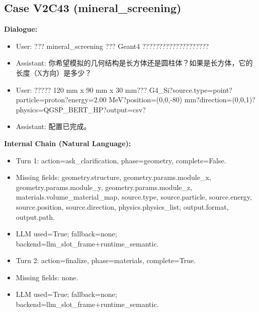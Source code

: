 \documentclass[11pt]{ctexart}
\begin{document}
\subsection{Case V2C43 (mineral\_screening)}
\textbf{Dialogue:}
\begin{itemize}
\item User: ??? mineral\_screening ??? Geant4 ????????????????????
\item Assistant: 你希望模拟的几何结构是长方体还是圆柱体？如果是长方体，它的长度（X方向）是多少？
\item User: ????? 120 mm x 90 mm x 30 mm??? G4\_Si?source.type=point?particle=proton?energy=2.00 MeV?position=(0,0,-80) mm?direction=(0,0,1)?physics=QGSP\_BERT\_HP?output=csv?
\item Assistant: 配置已完成。
\end{itemize}
\textbf{Internal Chain (Natural Language):}
\begin{itemize}
\item Turn 1: action=ask\_clarification, phase=geometry, complete=False.
\item Missing fields: geometry.structure, geometry.params.module\_x, geometry.params.module\_y, geometry.params.module\_z, materials.volume\_material\_map, source.type, source.particle, source.energy, source.position, source.direction, physics.physics\_list, output.format, output.path.
\item LLM used=True; fallback=none; backend=llm\_slot\_frame+runtime\_semantic.
\item Turn 2: action=finalize, phase=materials, complete=True.
\item Missing fields: none.
\item LLM used=True; fallback=none; backend=llm\_slot\_frame+runtime\_semantic.
\end{itemize}
\end{document}
